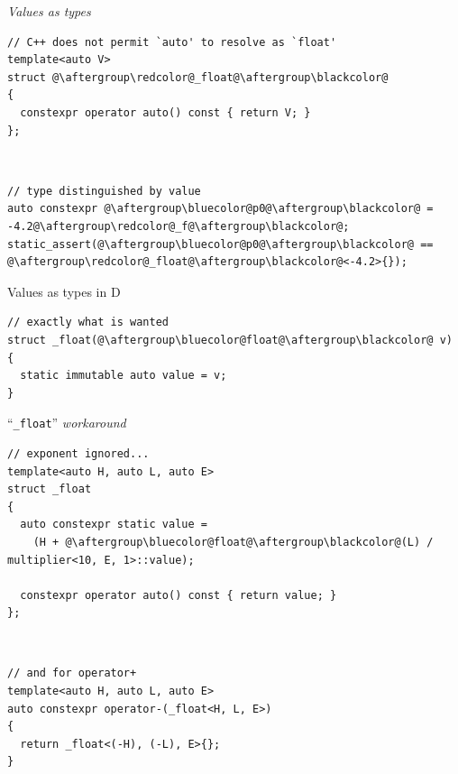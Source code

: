 \documentclass[xcolor=dvipsnames]{beamer}
\newcommand\dangersign[1][2ex]{%
  \renewcommand\stacktype{L}%
  \scaleto{\stackon[1.3pt]{\color{red}$\triangle$}{\tiny\bfseries !}}{#1}%
}
\begin{document}
\begin{frame}[fragile]{\dangersign \emph{Values as types} \dangersign}
\begin{lstlisting}
// C++ does not permit `auto' to resolve as `float'
template<auto V>
struct @\aftergroup\redcolor@_float@\aftergroup\blackcolor@
{
  constexpr operator auto() const { return V; }
};
\end{lstlisting}

~

\begin{lstlisting}
// type distinguished by value
auto constexpr @\aftergroup\bluecolor@p0@\aftergroup\blackcolor@ = -4.2@\aftergroup\redcolor@_f@\aftergroup\blackcolor@;
static_assert(@\aftergroup\bluecolor@p0@\aftergroup\blackcolor@ == @\aftergroup\redcolor@_float@\aftergroup\blackcolor@<-4.2>{});
\end{lstlisting}
\end{frame}


\begin{frame}[fragile]{Values as types in D}
\begin{lstlisting}
// exactly what is wanted
struct _float(@\aftergroup\bluecolor@float@\aftergroup\blackcolor@ v)
{
  static immutable auto value = v;
}
\end{lstlisting}
\end{frame}


\begin{frame}[fragile]{``\texttt{\_float}'' \emph{workaround}}
\begin{lstlisting}
// exponent ignored...
template<auto H, auto L, auto E>
struct _float
{
  auto constexpr static value =
    (H + @\aftergroup\bluecolor@float@\aftergroup\blackcolor@(L) / multiplier<10, E, 1>::value);

  constexpr operator auto() const { return value; }
};
\end{lstlisting}

~

\begin{lstlisting}
// and for operator+
template<auto H, auto L, auto E>
auto constexpr operator-(_float<H, L, E>)
{
  return _float<(-H), (-L), E>{};
}
\end{lstlisting}
\end{frame}
\end{document}
